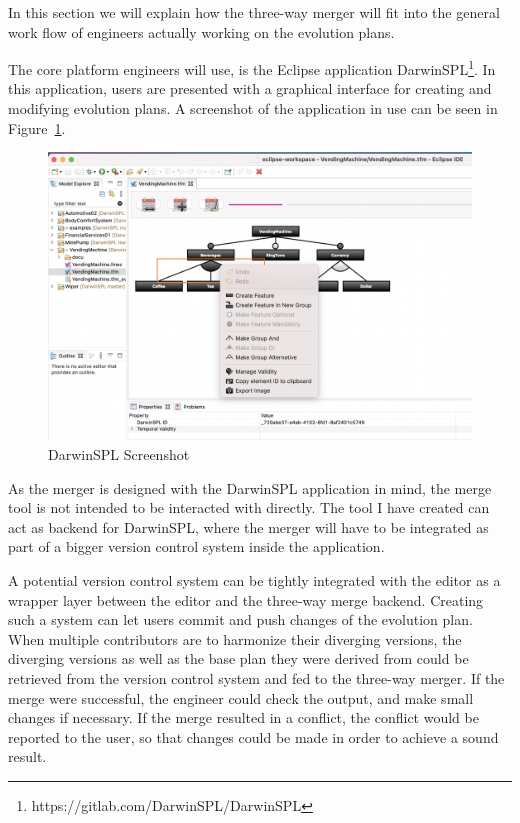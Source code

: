 \documentclass[a4paper,english]{ifimaster}
\begin{document}
In this section we will explain how the three-way merger will fit into the general work flow of engineers actually working on the evolution plans.

The core platform engineers will use, is the Eclipse application DarwinSPL\footnote{https://gitlab.com/DarwinSPL/DarwinSPL}. In this application, users are presented with a graphical interface for creating and modifying evolution plans. A screenshot of the application in use can be seen in Figure~\ref{fig:darwin_spl_screenshot}. 

\begin{figure}[htpb]
  \centering
  \includegraphics[width=\linewidth]{darwin_spl_screenshot.png}
  \caption{DarwinSPL Screenshot}%
  \label{fig:darwin_spl_screenshot}
\end{figure}

As the merger is designed with the DarwinSPL application in mind, the merge tool is not intended to be interacted with directly. The tool I have created can act as backend for DarwinSPL, where the merger will have to be integrated as part of a bigger version control system inside the application.

A potential version control system can be tightly integrated with the editor as a wrapper layer between the editor and the three-way merge backend. Creating such a system can let users commit and push changes of the evolution plan. When multiple contributors are to harmonize their diverging versions, the diverging versions as well as the base plan they were derived from could be retrieved from the version control system and fed to the three-way merger. If the merge were successful, the engineer could check the output, and make small changes if necessary. If the merge resulted in a conflict, the conflict would be reported to the user, so that changes could be made in order to achieve a sound result.
\end{document}
